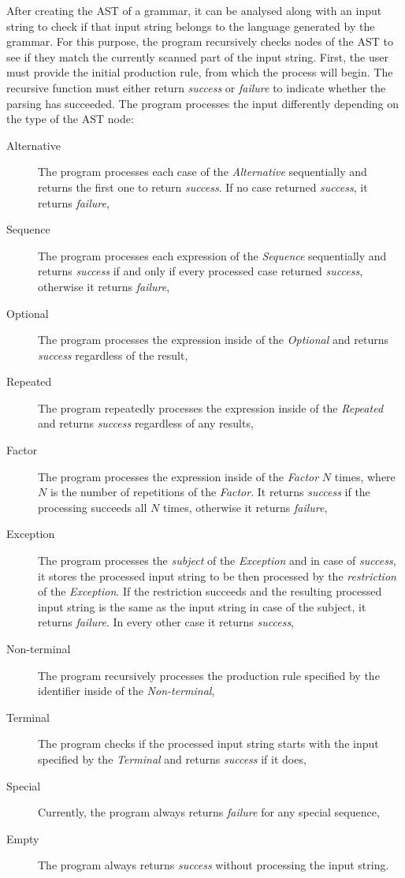 \documentclass[english,engineering]{wizthesis}
\begin{document}
After creating the AST of a grammar, it can be analysed along with an input
string to check if that input string belongs to the language generated by the
grammar. For this purpose, the program recursively checks nodes of the AST to
see if they match the currently scanned part of the input string. First, the
user must provide the initial production rule, from which the process will
begin. The recursive function must either return \emph{success} or
\emph{failure} to indicate whether the parsing has succeeded. The program
processes the input differently depending on the type of the AST node:
\begin{description}
  \item[Alternative] The program processes each case of the \emph{Alternative}
  sequentially and returns the first one to return \emph{success}. If no case
  returned \emph{success}, it returns \emph{failure},
  \item[Sequence] The program processes each expression of the \emph{Sequence}
  sequentially and returns \emph{success} if and only if every processed case
  returned \emph{success}, otherwise it returns \emph{failure},
  \item[Optional] The program processes the expression inside of the
  \emph{Optional} and returns \emph{success} regardless of the result,
  \item[Repeated] The program repeatedly processes the expression inside of the
  \emph{Repeated} and returns \emph{success} regardless of any results,
  \item[Factor] The program processes the expression inside of the \emph{Factor}
  $N$ times, where $N$ is the number of repetitions of the \emph{Factor}. It
  returns \emph{success} if the processing succeeds all $N$ times, otherwise it
  returns \emph{failure},
  \item[Exception] The program processes the \emph{subject} of the
  \emph{Exception} and in case of \emph{success}, it stores the processed input
  string to be then processed by the \emph{restriction} of the \emph{Exception}.
  If the restriction succeeds and the resulting processed input string is the
  same as the input string in case of the subject, it returns \emph{failure}.
  In every other case it returns \emph{success},
  \item[Non-terminal] The program recursively processes the production rule
  specified by the identifier inside of the \emph{Non-terminal},
  \item[Terminal] The program checks if the processed input string starts with
  the input specified by the \emph{Terminal} and returns \emph{success} if it
  does,
  \item[Special] Currently, the program always returns \emph{failure} for any
  special sequence,
  \item[Empty] The program always returns \emph{success} without processing the
  input string. 
\end{description}
\end{document}
